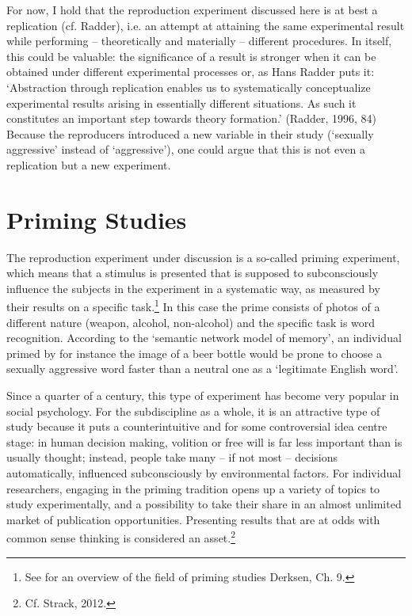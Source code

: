 \documentclass[twocolumn, serif, review, authordate]{jote-article}
\begin{document}
For now, I hold that the reproduction experiment discussed here is at best a replication (cf. Radder), i.e. an attempt at attaining the same experimental result while performing -- theoretically and materially -- different procedures. In itself, this could be valuable: the significance of a result is stronger when it can be obtained under different experimental processes or, as Hans Radder puts it: `Abstraction through replication enables us to systematically conceptualize experimental results arising in essentially different situations. As such it constitutes an important step towards theory formation.' (Radder, 1996, 84) Because the reproducers introduced a new variable in their study (`sexually aggressive' instead of `aggressive'), one could argue that this is not even a replication but a new experiment.


{}
\section*{Priming Studies}
\gotoreview
\label{sec:priming}
\noindent The reproduction experiment under discussion is a so-called priming experiment, which means that a stimulus is presented that is supposed to subconsciously influence the subjects in the experiment in a systematic way, as measured by their results on a specific task.\footnote{ See for an overview of the field of priming studies Derksen, Ch. 9.} In this case the prime consists of photos of a different nature (weapon, alcohol, non-alcohol) and the specific task is word recognition. According to the `semantic network model of memory', an individual primed by for instance the image of a beer bottle would be prone to choose a sexually aggressive word faster than a neutral one as a `legitimate English word'. 
 
Since a quarter of a century, this type of experiment has become very popular in social psychology. For the subdiscipline as a whole, it is an attractive type of study because it puts a counterintuitive and for some controversial idea centre stage: in human decision making, volition or free will is far less important than is usually thought; instead, people take many -- if not most -- decisions automatically, influenced subconsciously by environmental factors. For individual researchers, engaging in the priming tradition opens up a variety of topics to study experimentally, and a possibility to take their share in an almost unlimited market of publication opportunities. Presenting results that are at odds with common sense thinking is considered an asset.\footnote{ Cf. Strack, 2012.} 
 
\end{document}
